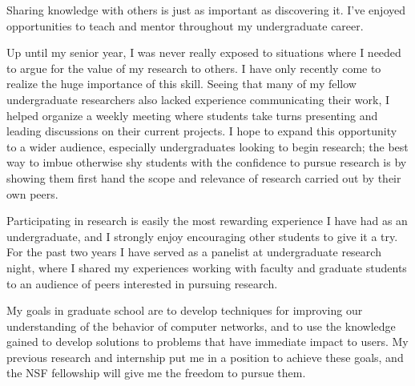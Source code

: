 \documentclass[12pt]{article}	%
\begin{document}
Sharing knowledge with others is just as important as
discovering it. I've enjoyed opportunities to
teach and mentor throughout my undergraduate career.

Up until my senior year, I was never really exposed to situations where I
needed to argue for the value of my research to others. I have
only recently come to realize the huge importance of this skill. Seeing that
many of my fellow undergraduate researchers also lacked experience
communicating their work, I helped organize a weekly meeting where students
take turns presenting and leading discussions on their current projects.
I hope to expand this opportunity to a wider audience, especially 
undergraduates looking to begin research; the best way to imbue otherwise
shy students with the confidence to pursue research is by showing them
first hand the scope and relevance of research carried out by their own peers.

Participating in research is easily the most rewarding experience I have
had as an undergraduate, and I strongly enjoy encouraging other students to
give it a try. For the past two years I have served as a panelist at
undergraduate research night, where I shared my experiences working with
faculty and graduate students to an audience of peers interested in pursuing research.


My goals in graduate school are to develop techniques for improving our understanding of the behavior of computer
networks, and to use the knowledge gained to develop solutions to problems that have
immediate impact to users. My previous research and internship put me in a position
to achieve these goals, and the NSF fellowship will give me the
freedom to pursue them.
\end{document}
